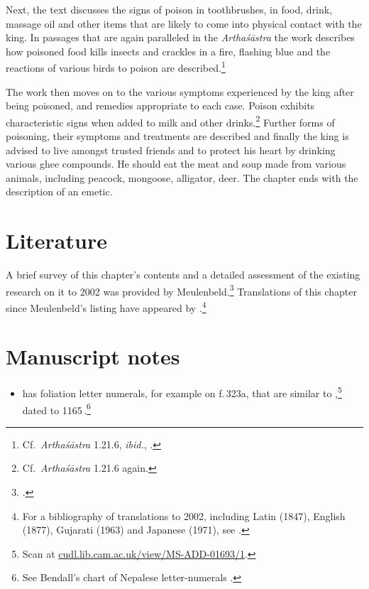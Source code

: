 Next, the text discusses the signs of poison in toothbrushes, in food, drink,
massage oil and other items that are likely to come into physical contact with the
king.  In passages that are again paralleled in the \emph{Arthaśāstra} the work
describes how poisoned food kills insects and crackles in a fire, flashing blue
and  the reactions of various birds to poison are described.\footnote{Cf.\
\emph{Arthaśāstra} 1.21.6, \emph{ibid.}, \citet[96]{oliv-2013}.}


The work then moves on to the various symptoms experienced by the king after 
being poisoned, and remedies appropriate to each case.  Poison exhibits 
characteristic signs when added to milk and other drinks.\footnote{Cf.\
\emph{Arthaśāstra} 1.21.6 again.} Further forms of poisoning, their symptoms 
and treatments are described  and finally the king is advised to live amongst 
trusted friends and to protect his heart by drinking various ghee compounds.  He 
should eat the meat and soup made from various animals, including peacock, 
mongoose, alligator, deer.  The chapter ends with the description of an emetic.

\section{Literature}

A brief survey of this chapter's contents and a detailed assessment of
the existing research on it to 2002 was provided by
Meulenbeld.\footcite[IA, 289--290]{meul-hist} Translations of this
chapter since Meulenbeld's listing have appeared by
\textcites[131--139]{wuja-2003}[3,
1--15]{shar-1999}{srik-2002}.\footnote{For a bibliography of translations
    to 2002, including Latin (1847), English (1877), Gujarati (1963) and
    Japanese (1971), see \cite[IB, 314--315]{meul-hist}.}


\section{Manuscript notes}

\begin{itemize}
    \item {} has foliation letter numerals, for example
on f.\,323a, that are similar to \MScite{Cambridge CUL 
Add.1693},\footnote{Scan
at 
\href{https://cudl.lib.cam.ac.uk/view/MS-ADD-01693/1}
{cudl.lib.cam.ac.uk/view/MS-ADD-01693/1}.}
 dated to 1165\,\CE.\footnote{See Bendall's chart of Nepalese 
 letter-numerals \citep[Lithograph V, 
after p.\,225]{bend-budd}.}
\end{itemize}

